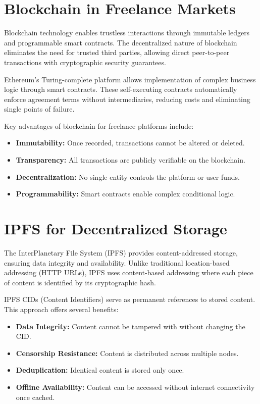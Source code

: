\section{Blockchain in Freelance Markets}

Blockchain technology enables trustless interactions through immutable ledgers and programmable smart contracts. The decentralized nature of blockchain eliminates the need for trusted third parties, allowing direct peer-to-peer transactions with cryptographic security guarantees.

Ethereum's Turing-complete platform allows implementation of complex business logic through smart contracts. These self-executing contracts automatically enforce agreement terms without intermediaries, reducing costs and eliminating single points of failure.

Key advantages of blockchain for freelance platforms include:
\begin{itemize}
    \item \textbf{Immutability:} Once recorded, transactions cannot be altered or deleted.
    \item \textbf{Transparency:} All transactions are publicly verifiable on the blockchain.
    \item \textbf{Decentralization:} No single entity controls the platform or user funds.
    \item \textbf{Programmability:} Smart contracts enable complex conditional logic.
\end{itemize}

\section{IPFS for Decentralized Storage}

The InterPlanetary File System (IPFS) provides content-addressed storage, ensuring data integrity and availability. Unlike traditional location-based addressing (HTTP URLs), IPFS uses content-based addressing where each piece of content is identified by its cryptographic hash.

IPFS CIDs (Content Identifiers) serve as permanent references to stored content. This approach offers several benefits:
\begin{itemize}
    \item \textbf{Data Integrity:} Content cannot be tampered with without changing the CID.
    \item \textbf{Censorship Resistance:} Content is distributed across multiple nodes.
    \item \textbf{Deduplication:} Identical content is stored only once.
    \item \textbf{Offline Availability:} Content can be accessed without internet connectivity once cached.
\end{itemize}

